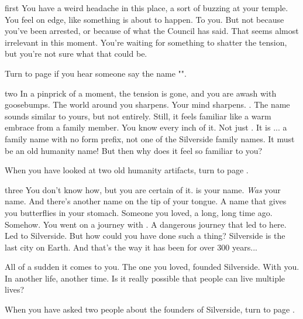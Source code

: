 \documentclass[greennotebook]{Silversiders} %
\begin{document}
\startnotebook{\nIngenuityGreen{}}

\begin{page}{first}
You have a weird headache in this place, a sort of buzzing at your temple. You feel on edge, like something is about to happen. To you. But not because you've been arrested, or because of what the Council has said. That seems almost irrelevant in this moment. You're waiting for something to shatter the tension, but you're not sure what that could be.

Turn to page  if you hear someone say the name "\cIngenuityOld{}".
\end{page}

\begin{page}{two}
In a pinprick of a moment, the tension is gone, and you are awash with goosebumps. The world around you sharpens. Your mind sharpens. \cIngenuityOld{}. The name sounds similar to yours, but not entirely. Still, it feels familiar like a warm embrace from a family member. You know every inch of it. Not just \cIngenuityOld{}. It is \cIngenuityOld{\intro}... a family name with no form prefix, not one of the Silverside family names. It must be an old humanity name! But then why does it feel so familiar to you?

When you have looked at two old humanity artifacts, turn to page .
\end{page}

\begin{page}{three}
You don't know how, but you are certain of it. \cIngenuityOld{\intro} is your name. \emph{Was} your name. And there's another name on the tip of your tongue. A name that gives you butterflies in your stomach. Someone you loved, a long, long time ago. Somehow. You went on a journey with \cIngenuityOld{\them}. A dangerous journey that led to here. Led to Silverside. But how could you have done such a thing? Silverside is the last city on Earth. And that's the way it has been for over 300 years...

All of a sudden it comes to you. The one you loved, \cSavior{\they} founded Silverside. With you. In another life, another time. Is it really possible that people can live multiple lives?

When you have asked two people about the founders of Silverside, turn to page .
\end{page}
\end{document}
